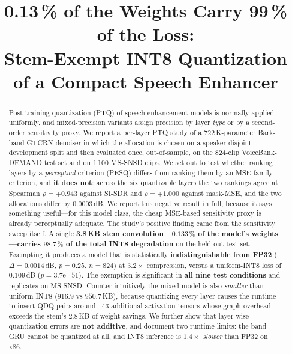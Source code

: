\documentclass[conference]{IEEEtran}
\begin{document}
\title{0.13\,\% of the Weights Carry 99\,\% of the Loss:\\Stem-Exempt INT8 Quantization\\of a Compact Speech Enhancer}

\author{
}

\maketitle

\begin{abstract}
Post-training quantization (PTQ) of speech enhancement models is normally applied uniformly, and
mixed-precision variants assign precision by layer \emph{type} or by a second-order sensitivity
proxy. We report a per-layer PTQ study of a 722\,K-parameter Bark-band GTCRN denoiser in which the
allocation is chosen on a speaker-disjoint development split and then evaluated once,
out-of-sample, on the 824-clip VoiceBank-DEMAND test set and on 1\,100 MS-SNSD clips.
We set out to test whether ranking layers by a \emph{perceptual} criterion (PESQ) differs from
ranking them by an MSE-family criterion, and \textbf{it does not}: across the six quantizable
layers the two rankings agree at Spearman $\rho = +0.943$ against SI-SDR and $\rho = +1.000$
against mask-MSE, and the two allocations differ by $0.0003$\,dB. We report this negative result in
full, because it says something useful---for this model class, the cheap MSE-based sensitivity
proxy is already perceptually adequate.
The study's positive finding came from the sensitivity sweep itself. A single \textbf{3.8\,KB stem
convolution---$0.133\,\%$ of the model's weights---carries $98.7\,\%$ of the total INT8
degradation} on the held-out test set. Exempting it produces a model that is statistically
\textbf{indistinguishable from FP32} ($\Delta = 0.0014$\,dB, $p = 0.25$, $n = 824$) at
$3.2\times$ compression, versus a uniform-INT8 loss of $0.109$\,dB
($p = 3.7\mathrm{e}{-51}$). The exemption is significant in \textbf{all nine test conditions} and
replicates on MS-SNSD. Counter-intuitively the mixed model is also \emph{smaller} than uniform INT8
($916.9$ vs $950.7$\,KB), because quantizing every layer causes the runtime to insert QDQ pairs
around 143 additional activation tensors whose graph overhead exceeds the stem's $2.8$\,KB of
weight savings.
We further show that layer-wise quantization errors are \textbf{not additive}, and document two
runtime limits: the band GRU cannot be quantized at all, and INT8 inference is $1.4\times$
\emph{slower} than FP32 on x86.
\end{abstract}
\end{document}
